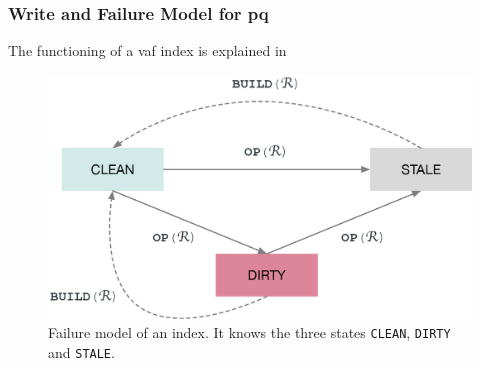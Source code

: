 \subsubsection{Write and Failure Model for \texorpdfstring{\acrfull{pq}}{PQ}}
The functioning of a \acrshort{vaf} index is explained in 

\begin{figure}[bt]
    \centering
    \includegraphics[width=\textwidth]{figures/failure_model.eps}
    \caption{Failure model of an index. It knows the three states \texttt{CLEAN}, \texttt{DIRTY} and \texttt{STALE}.}
    \label{figure:failure_model}
\end{figure}